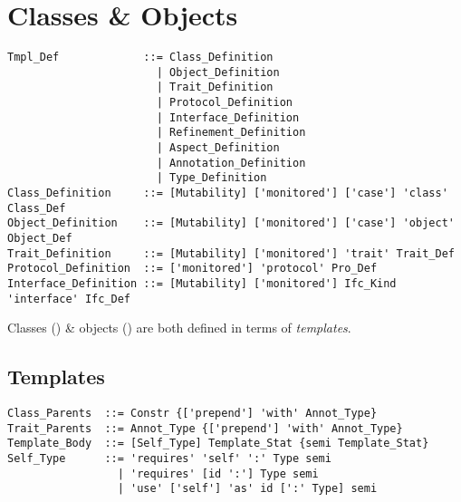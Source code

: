 
\chapter{Classes \& Objects}

\minitoc

\newpage

\grammar\begin{lstlisting}
Tmpl_Def             ::= Class_Definition
                       | Object_Definition
                       | Trait_Definition
                       | Protocol_Definition
                       | Interface_Definition
                       | Refinement_Definition
                       | Aspect_Definition
                       | Annotation_Definition
                       | Type_Definition
Class_Definition     ::= [Mutability] ['monitored'] ['case'] 'class' Class_Def
Object_Definition    ::= [Mutability] ['monitored'] ['case'] 'object' Object_Def
Trait_Definition     ::= [Mutability] ['monitored'] 'trait' Trait_Def
Protocol_Definition  ::= ['monitored'] 'protocol' Pro_Def
Interface_Definition ::= [Mutability] ['monitored'] Ifc_Kind 'interface' Ifc_Def
\end{lstlisting}

Classes () \& objects () are both defined in terms of {\em templates}. 





\section{Templates}
\label{sec:templates}

\grammar\begin{lstlisting}
Class_Parents  ::= Constr {['prepend'] 'with' Annot_Type} 
Trait_Parents  ::= Annot_Type {['prepend'] 'with' Annot_Type}
Template_Body  ::= [Self_Type] Template_Stat {semi Template_Stat}
Self_Type      ::= 'requires' 'self' ':' Type semi
                 | 'requires' [id ':'] Type semi
                 | 'use' ['self'] 'as' id [':' Type] semi
\end{lstlisting}

